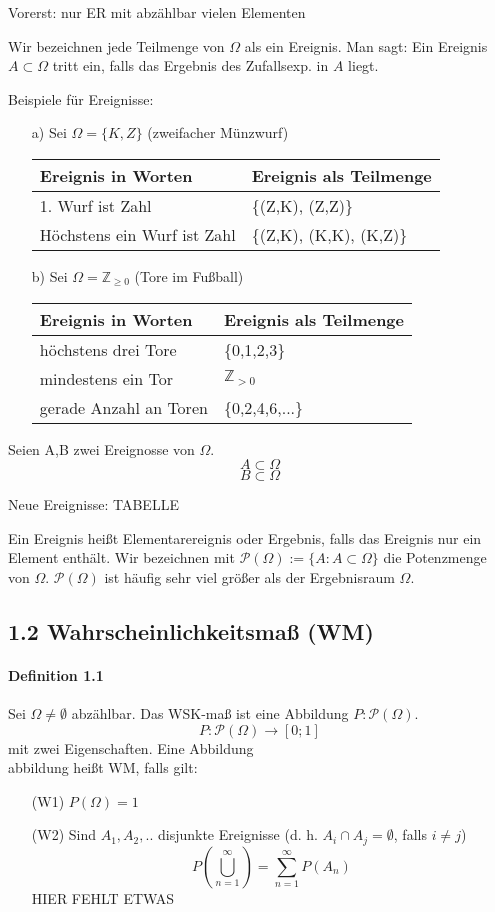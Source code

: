 \documentclass[10pt,a4paper,titlepage]{book}
\begin{document}
Vorerst: nur ER mit abzählbar vielen Elementen

Wir bezeichnen jede Teilmenge von $\Omega$ als ein Ereignis. Man sagt: Ein Ereignis $A \subset \Omega$ tritt ein, falls das Ergebnis des Zufallsexp. in $A$ liegt.

Beispiele für Ereignisse:
\begin{itemize}
\item [a)] Sei $\Omega = \{K,Z\}$ (zweifacher Münzwurf)\\

\begin{tabular}{l|l}
Ereignis in Worten          & Ereignis als Teilmenge  \\ \hline
1. Wurf ist Zahl            & \{(Z,K), (Z,Z)\}        \\
Höchstens ein Wurf ist Zahl & \{(Z,K), (K,K), (K,Z)\}
\end{tabular}

\item [b)] Sei $\Omega = \mathbb{Z}_{\geq 0}$ (Tore im Fußball)\\

\begin{tabular}{l|l}
Ereignis in Worten          & Ereignis als Teilmenge  \\ \hline
höchstens drei Tore           & \{0,1,2,3\}        \\
mindestens ein Tor & $\mathbb{Z}_{> 0}$ \\
gerade Anzahl an Toren & \{0,2,4,6,...\}
\end{tabular}
\end{itemize}

Seien A,B zwei Ereignosse von $\Omega$.
$$A \subset \Omega$$
$$B \subset \Omega$$

Neue Ereignisse:
TABELLE

Ein Ereignis heißt Elementarereignis oder Ergebnis, falls das Ereignis nur ein Element enthält. Wir bezeichnen mit $\mathcal{P}(\Omega) := \{A: A\subset \Omega\}$ die Potenzmenge von $\Omega$. $\mathcal{P}(\Omega)$ ist häufig sehr viel größer als der Ergebnisraum $\Omega$.

\subsection*{1.2 Wahrscheinlichkeitsmaß (WM)}
\newcommand{\abbildung}{$P: \mathcal{P}(\Omega) \rightarrow [0;1]$}
\paragraph{Definition 1.1}  Sei $\Omega \neq \emptyset$ abzählbar. Das WSK-maß ist eine Abbildung $P:\mathcal{P}(\Omega)$.
$$P: \mathcal{P}(\Omega) \rightarrow [0;1]$$
mit zwei Eigenschaften.
Eine Abbildung \\abbildung heißt WM, falls gilt:
\begin{itemize}
\item[(W1)] $P(\Omega) = 1$
\item[(W2)] Sind $A_1, A_2, ..$ disjunkte Ereignisse (d. h. $A_i \cap A_j = \emptyset$, falls $i \neq j$)
$$P\left(\bigcup_{n=1}^\infty\right)  = \sum_{n =1}^\infty P(A_n)$$ HIER FEHLT ETWAS
\end{itemize}
\end{document}
